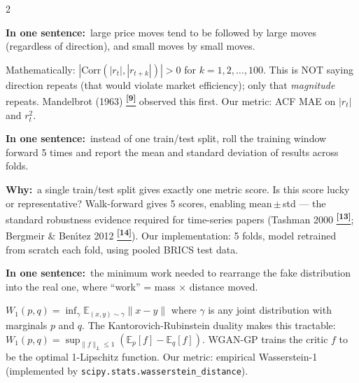 \documentclass[10pt]{article}
\newcommand{\indigobox}[2]{\begin{tcolorbox}[mybox={Indigo}{IBg},title={#1}]#2\end{tcolorbox}}
\newcommand{\tcite}[1]{%
  \hyperlink{R:#1}{\textsuperscript{\scriptsize\textbf{[#1]}}}}
\newcommand{\E}{\mathbb{E}}
\begin{document}
\begin{multicols}{2}
\indigobox{Volatility Clustering}{%
\textbf{In one sentence:}\ large price moves tend to be followed by large moves (regardless of direction), and small moves by small moves.

Mathematically: $|\text{Corr}(|r_t|, |r_{t+k}|)| > 0$ for $k = 1, 2, \ldots, 100$. This is NOT saying direction repeats (that would violate market efficiency); only that \emph{magnitude} repeats. Mandelbrot (1963)\tcite{9} observed this first. Our metric: ACF MAE on $|r_t|$ and $r_t^2$.}

\indigobox{Walk-Forward Validation}{%
\textbf{In one sentence:}\ instead of one train/test split, roll the training window forward 5 times and report the mean and standard deviation of results across folds.

\textbf{Why:}\ a single train/test split gives exactly one metric score. Is this score lucky or representative? Walk-forward gives 5 scores, enabling mean\,$\pm$\,std --- the standard robustness evidence required for time-series papers (Tashman 2000\tcite{13}; Bergmeir \& Ben\'{\i}tez 2012\tcite{14}). Our implementation: 5 folds, model retrained from scratch each fold, using pooled BRICS test data.}

\indigobox{Wasserstein Distance}{%
\textbf{In one sentence:}\ the minimum work needed to rearrange the fake distribution into the real one, where ``work'' = mass × distance moved.

$W_1(p,q) = \inf_\gamma \E_{(x,y) \sim \gamma}\|x-y\|$ where $\gamma$ is any joint distribution with marginals $p$ and $q$. The Kantorovich-Rubinstein duality makes this tractable: $W_1(p,q) = \sup_{\|f\|_L \leq 1}(\E_p[f] - \E_q[f])$. WGAN-GP trains the critic $f$ to be the optimal 1-Lipschitz function. Our metric: empirical Wasserstein-1 (implemented by \texttt{scipy.stats.wasserstein\_distance}).}


\end{multicols}
\end{document}

